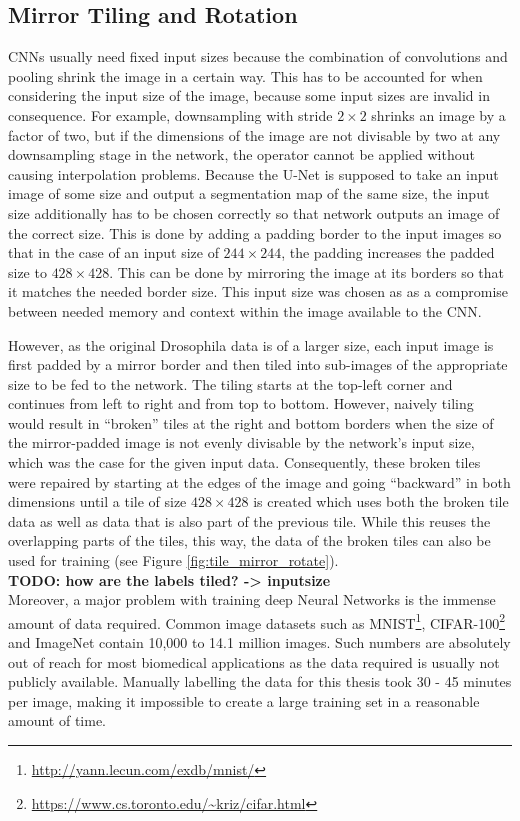 		\subsection{Mirror Tiling and Rotation}
\label{subsec:mirror_tiling}
CNNs usually need fixed input sizes because the combination of convolutions and pooling shrink the image in a certain way. This has to be accounted for when considering the input size of the image, because some input sizes are invalid in consequence. For example, downsampling with stride $2 \times 2$ shrinks an image by a factor of two, but if the dimensions of the image are not divisable by two at any downsampling stage in the network, the operator cannot be applied without causing interpolation problems. Because the U-Net is supposed to take an input image of some size and output a segmentation map of the same size, the input size additionally has to be chosen correctly so that network outputs an image of the correct size. This is done by adding a padding border to the input images so that in the case of an input size of $244 \times 244$, the padding increases the padded size to $428 \times 428$. This can be done by mirroring the image at its borders so that it matches the needed border size. This input size was chosen as as a compromise between needed memory and context within the image available to the CNN.

However, as the original Drosophila data is of a larger size, each input image is first padded by a mirror border and then tiled into sub-images of the appropriate size to be fed to the network. The tiling starts at the top-left corner and continues from left to right and from top to bottom. However, naively tiling would result in ``broken'' tiles at the right and bottom borders when the size of the mirror-padded  image is not evenly divisable by the network's input size, which was the case for the given input data. Consequently, these broken tiles were repaired by starting at the edges of the image and going ``backward'' in both dimensions until a tile of size $428 \times 428$ is created which uses both the broken tile data as well as data that is also part of the previous tile. While this reuses the overlapping parts of the tiles, this way, the data of the broken tiles can also be used for training (see Figure \ref{fig:tile_mirror_rotate}).\\

\textbf{TODO: how are the labels tiled? -> inputsize}\\

\noindent Moreover, a major problem with training deep Neural Networks is the immense amount of data required. Common image datasets such as MNIST\footnote{\url{http://yann.lecun.com/exdb/mnist/}}, CIFAR-100\footnote{\url{https://www.cs.toronto.edu/~kriz/cifar.html}} and ImageNet \cite{ILSVRC} contain 10,000 to 14.1 million images. Such numbers are absolutely out of reach for most biomedical applications as the data required is usually not publicly available. Manually labelling the data for this thesis took 30 - 45 minutes per image, making it impossible to create a large training set in a reasonable amount of time.

